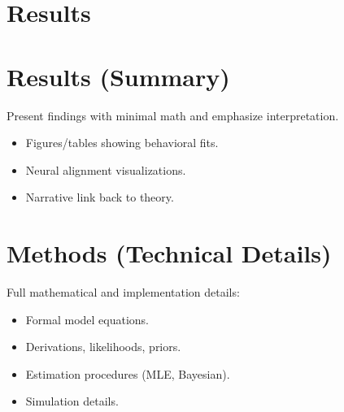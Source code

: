 \section{Results}


\section{Results (Summary)}
    Present findings with minimal math and emphasize interpretation.  
    \begin{itemize}
        \item Figures/tables showing behavioral fits.  
        \item Neural alignment visualizations.  
        \item Narrative link back to theory.  
    \end{itemize}


\section{Methods (Technical Details)}
    Full mathematical and implementation details:
    \begin{itemize}
        \item Formal model equations.  
        \item Derivations, likelihoods, priors.  
        \item Estimation procedures (MLE, Bayesian).  
        \item Simulation details.  
    \end{itemize}



